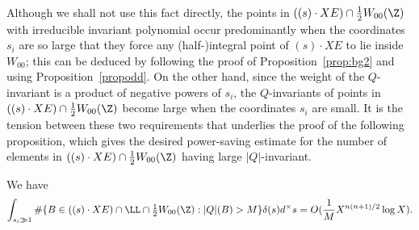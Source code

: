 Although we shall not use this fact directly,
the points in $((s)\cdot XE)\cap \frac12W_{00}(\Z)$ with irreducible
invariant polynomial occur predominantly when the coordinates $s_i$
are so large that they force any (half-)integral point of $(s)\cdot
XE$ to lie inside $W_{00}$; this can be deduced by following the
proof of Proposition~\ref{prop:bg2} and using Proposition~\ref{propodd}.
On the other hand, since the weight of
the $Q$-invariant is a product of negative powers of $s_i$, the
$Q$-invariants of points in $((s)\cdot XE)\cap \frac12W_{00}(\Z)$
become large when the coordinates $s_i$ are small.  It is the tension
between these two requirements that underlies the proof of the following proposition,
which gives the desired power-saving estimate for the
number of elements in $((s)\cdot XE) \cap \frac12W_{00}(\Z)$ having
large $|Q|$-invariant.

\begin{proposition}
\notready\label{proplargeQbound}
We have
\begin{equation*}
\int_{s_i\gg 1} \#\{B\in ((s)\cdot XE)\cap \LL\cap
{\textstyle\frac12} W_{00}(\Z):|Q|(B)>M\}\delta(s)d^\times s=O(\frac{1}{M}X^{n(n+1)/2}\log X).
\end{equation*}
\end{proposition}


